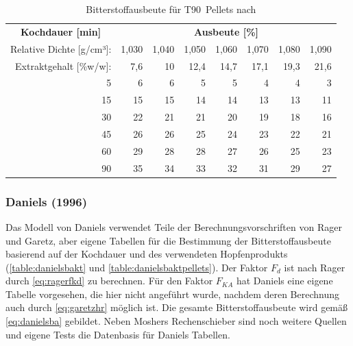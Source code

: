 \documentclass[a4paper,parskip=half]{scrartcl}
\newcommand{\FKd}{F_{\mathit{d}}}
\newcommand{\FHR}{F_{\mathit{KA}}}
\begin{document}
\begin{table}[H]
\centering
\begin{tabular}{rrrrrrrr} 
\toprule
\multicolumn{1}{c}{\textbf{Kochdauer [min]}} & \multicolumn{7}{c}{\textbf{Ausbeute [\%]}}  \\
Relative Dichte [g/cm³]:                                        & 1,030 & 1,040 & 1,050 & 1,060 & 1,070 & 1,080  & 1,090                   \\
Extraktgehalt [\%w/w]:                                            & 7,6 & 10 & 12,4 & 14,7 & 17,1 & 19,3  & 21,6                   \\  
\midrule
5                                            & 6     & 6     & 5     & 5     & 4     & 4      & 3                          \\
15                                           & 15    & 15    & 14    & 14    & 13    & 13     & 11                         \\
30                                           & 22    & 21    & 21    & 20    & 19    & 18     & 16                         \\
45                                           & 26    & 26    & 25    & 24    & 23    & 22     & 21                         \\
60                                           & 29    & 28    & 28    & 27    & 26    & 25     & 23                         \\
90                                           & 35    & 34    & 33    & 32    & 31    & 29     & 27                         \\
\bottomrule
\end{tabular}
\caption{Bitterstoffausbeute für T90~Pellets nach \citeauthor{Mosher1994} \parencite[51]{Holle2010}}
\label{table:mosherbaktpellets}
\end{table}

\subsubsection*{Daniels (1996)}

Das Modell von Daniels verwendet Teile der Berechnungsvorschriften von Rager und Garetz, aber eigene Tabellen für die Bestimmung der Bitterstoffausbeute basierend auf der Kochdauer und des verwendeten Hopfenprodukts (\autoref{table:danielsbakt} und \autoref{table:danielsbaktpellets}). Der Faktor $\FKd$ ist nach Rager durch \autoref{eq:ragerfkd} zu berechnen. Für den Faktor $\FHR$ hat Daniels eine eigene Tabelle vorgesehen, die hier nicht angeführt wurde, nachdem deren Berechnung auch durch \autoref{eq:garetzhr} möglich ist. Die gesamte Bitterstoffausbeute wird gemäß \autoref{eq:danielsba} gebildet. Neben Moshers Rechenschieber sind noch weitere Quellen und eigene Tests die Datenbasis für Daniels Tabellen. \parencite[80,85-88]{Daniels1996}
\end{document}
